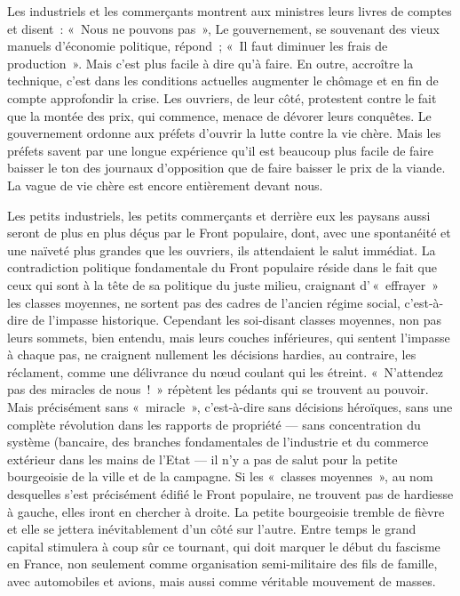 \documentclass[french,twoside]{book} %
\begin{document}
Les industriels et les commerçants montrent aux ministres leurs livres de comptes et disent : « Nous ne pouvons pas », Le gouvernement, se souvenant des vieux manuels d’économie politique, répond ; « Il faut diminuer les frais de production ». Mais c’est plus facile à dire qu’à faire. En outre, accroître la technique, c’est dans les conditions actuelles augmenter le chômage et en fin de compte approfondir la crise. Les ouvriers, de leur côté, protestent contre le fait que la montée des prix, qui commence, menace de dévorer leurs conquêtes. Le gouvernement ordonne aux préfets d’ouvrir la lutte contre la vie chère. Mais les préfets savent par une longue expérience qu’il est beaucoup plus facile de faire baisser le ton des journaux d’opposition que de faire baisser le prix de la viande. La vague de vie chère est encore entièrement devant nous.\par
Les petits industriels, les petits commerçants et derrière eux les paysans aussi seront de plus en plus déçus par le Front populaire, dont, avec une spontanéité et une naïveté plus grandes que les ouvriers, ils attendaient le salut immédiat. La contradiction politique fondamentale du Front populaire réside dans le fait que ceux qui sont à la tête de sa politique du juste milieu, craignant d’ « effrayer » les classes moyennes, ne sortent pas des cadres de l’ancien régime social, c’est-à-dire de l’impasse historique. Cependant les soi-disant classes moyennes, non pas leurs sommets, bien entendu, mais leurs couches inférieures, qui sentent l’impasse à chaque pas, ne craignent nullement les décisions hardies, au contraire, les réclament, comme une délivrance du nœud coulant qui les étreint. « N’attendez pas des miracles de nous ! » répètent les pédants qui se trouvent au pouvoir. Mais  précisément sans « miracle », c’est-à-dire sans décisions héroïques, sans une complète révolution dans les rapports de propriété — sans concentration du système (bancaire, des branches fondamentales de l’industrie et du commerce extérieur dans les mains de l’Etat — il n’y a pas de salut pour la petite bourgeoisie de la ville et de la campagne. Si les « classes moyennes », au nom desquelles s’est précisément édifié le Front populaire, ne trouvent pas de hardiesse à gauche, elles iront en chercher à droite. La petite bourgeoisie tremble de fièvre et elle se jettera inévitablement d’un côté sur l’autre. Entre temps le grand capital stimulera à coup sûr ce tournant, qui doit marquer le début du fascisme en France, non seulement comme organisation semi-militaire des fils de famille, avec automobiles et avions, mais aussi comme véritable mouvement de masses.\par
\end{document}
